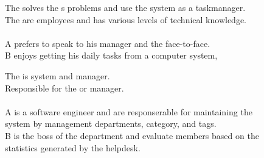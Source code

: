 \begin{figure}[h]
\begin{sadlistar}{\Astaff}
 The \astaff{} solves the \aclient[]s problems and use the system as a taskmanager.  \\
 The \astaff[] are employees and has various levels of technical knowledge. \\
\\ \astaff[c] A prefers to speak to his manager and the \aclient[] face-to-face.\\
\astaff[c] B enjoys getting his daily tasks from a computer system, 
 \end{sadlistar}
 \caption{}
 \label{fig:actorstaff}
 \end{figure}


\begin{figure}[h]
\begin{sadlistar}{\admin[c]}
 The \admin[] is system and \astaff[] manager. \\
 Responsible for the \hdesk[] or \astaff[] manager. \\
\\ \admin[c] A is a software engineer and are responserable for maintaining the system by management departments, category, and tags. \\
\admin[c] B is the boss of the department and evaluate \staff members based on the statistics generated by the helpdesk.
 \end{sadlistar}
 \caption{}
 \label{fig:actoradmin}
 \end{figure}